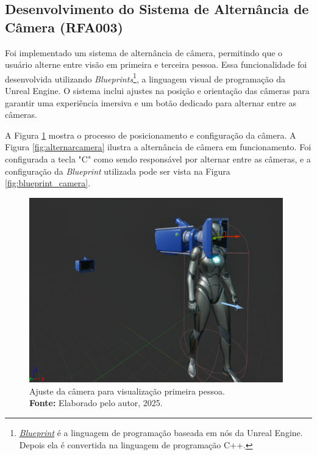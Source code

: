 \subsection{Desenvolvimento do Sistema de Alternância de Câmera (RFA003)}
Foi implementado um sistema de alternância de câmera, permitindo que o usuário alterne entre visão em primeira e terceira pessoa. Essa funcionalidade foi desenvolvida utilizando \textit{Blueprints}\footnote{\href{https://dev.epicgames.com/community/learning/tutorials/K8Gx/unreal-engine-comparacao-entre-blueprints-e-c-casos-de-uso}{\textit{Blueprint}} é a linguagem de programação baseada em nós da Unreal Engine. Depois ela é convertida na linguagem de programação C++. }, a linguagem visual de programação da Unreal Engine. O sistema inclui ajustes na posição e orientação das câmeras para garantir uma experiência imersiva e um botão dedicado para alternar entre as câmeras.

A Figura \ref{fig:config_camera} mostra o processo de posicionamento e configuração da câmera. A Figura \ref{fig:alternarcamera} ilustra a alternância de câmera em funcionamento.
Foi configurada a tecla "C"  como sendo responsável por alternar entre as câmeras, e a configuração da \textit{Blueprint} utilizada pode ser vista na Figura \ref{fig:blueprint_camera}.

\begin{figure}[H]
        \centering
        \includegraphics[height=8cm, keepaspectratio]{img/unreal/ajuste de câmera 1ºpessoa.png}
        \caption{Ajuste da câmera para visualização primeira pessoa. \\
            \textbf{Fonte:} Elaborado pelo autor, 2025.}
        \label{fig:config_camera}
\end{figure}


